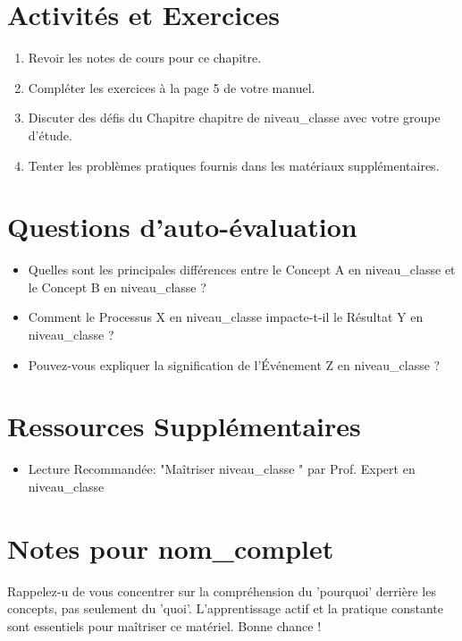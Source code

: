 \documentclass{article}
\begin{document}
\section*{Activités et Exercices}
\begin{enumerate}
    \item Revoir les notes de cours pour ce chapitre.
    \item Compléter les exercices à la page {5} de votre manuel.
    \item Discuter des défis du Chapitre {{ chapitre }} de {{ niveau_classe }} avec votre groupe d'étude.
    \item Tenter les problèmes pratiques fournis dans les matériaux supplémentaires.
\end{enumerate}

\section*{Questions d'auto-évaluation}
\begin{itemize}
    \item Quelles sont les principales différences entre le Concept A en {{ niveau_classe }} et le Concept B en {{ niveau_classe }}?
    \item Comment le Processus X en {{ niveau_classe }} impacte-t-il le Résultat Y en {{ niveau_classe }}?
    \item Pouvez-vous expliquer la signification de l'Événement Z en {{ niveau_classe }}?
\end{itemize}

\section*{Ressources Supplémentaires}
\begin{itemize}
    \item Lecture Recommandée: "Maîtriser {{ niveau_classe }}" par Prof. Expert en {{ niveau_classe }}
\end{itemize}

\section*{Notes pour {{ nom_complet }}}
Rappelez-u de vous concentrer sur la compréhension du 'pourquoi' derrière les concepts, pas seulement du 'quoi'. L'apprentissage actif et la pratique constante sont essentiels pour maîtriser ce matériel. Bonne chance !
\end{document}
